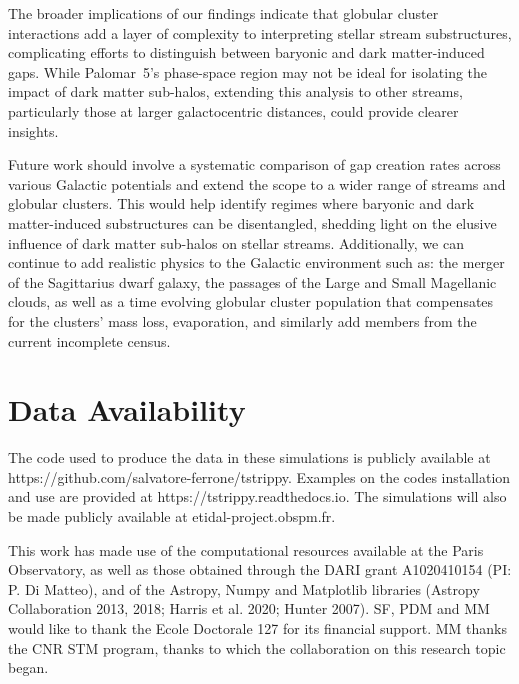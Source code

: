 \documentclass{aa}
\begin{document}
  The broader implications of our findings indicate that globular cluster interactions add a layer of complexity to interpreting stellar stream substructures, complicating efforts to distinguish between baryonic and dark matter-induced gaps. While Palomar~5's phase-space region may not be ideal for isolating the impact of dark matter sub-halos, extending this analysis to other streams, particularly those at larger galactocentric distances, could provide clearer insights. 

  Future work should involve a systematic comparison of gap creation rates across various Galactic potentials and extend the scope to a wider range of streams and globular clusters. This would help identify regimes where baryonic and dark matter-induced substructures can be disentangled, shedding light on the elusive influence of dark matter sub-halos on stellar streams. Additionally, we can continue to add realistic physics to the Galactic environment such as: the merger of the Sagittarius dwarf galaxy, the passages of the Large and Small Magellanic clouds, as well as a time evolving globular cluster population that compensates for the clusters' mass loss, evaporation, and similarly add members from the current incomplete census.


  
\section*{Data Availability}

  The code used to produce the data in these simulations is publicly available at https://github.com/salvatore-ferrone/tstrippy. Examples on the codes installation and use are provided at https://tstrippy.readthedocs.io. The simulations will also be made publicly available at etidal-project.obspm.fr.



\begin{acknowledgements}
  This work has made use of the computational resources available at the Paris Observatory, as well as those obtained through the DARI grant A1020410154 (PI: P. Di Matteo), and of the Astropy, Numpy and Matplotlib libraries (Astropy Collaboration 2013, 2018; Harris et al. 2020; Hunter 2007). SF, PDM and MM would like to thank the Ecole Doctorale 127 for its financial support. MM thanks the CNR STM program, thanks to which the collaboration on this research topic began. 
\end{acknowledgements}
\end{document}
